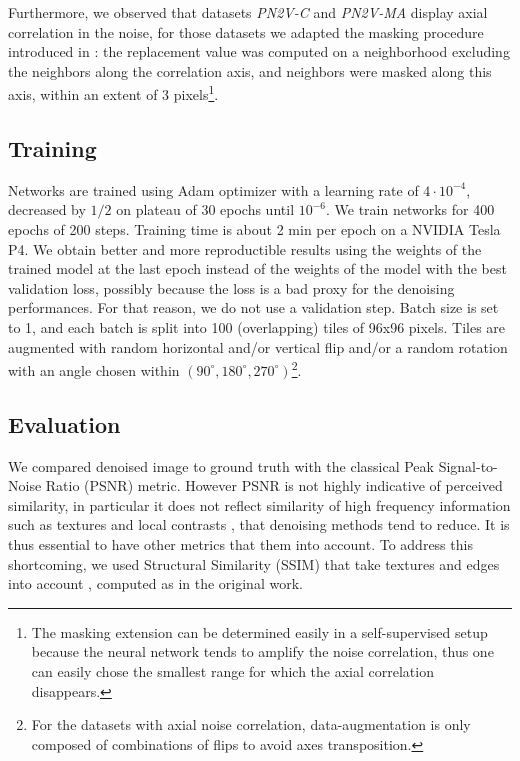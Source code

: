 \documentclass{article}
\begin{document}
Furthermore, we observed that datasets \emph{PN2V-C} and \emph{PN2V-MA} display axial correlation in the noise, for those datasets we adapted the masking procedure introduced in \cite{broaddus2020removing}: the replacement value was computed on a neighborhood excluding the neighbors along the correlation axis, and neighbors were masked along this axis, within an extent of 3 pixels\footnote{The masking extension can be determined easily in a self-supervised setup because the neural network tends to amplify the noise correlation, thus one can easily chose the smallest range for which the axial correlation disappears.}.

\subsection{Training}
Networks are trained using Adam optimizer with a learning rate of $4\cdot10^{-4}$, decreased by $1/2$ on plateau of 30 epochs until $10^{-6}$. We train networks for 400 epochs of 200 steps.
Training time is about 2 min per epoch on a NVIDIA Tesla P4.
We obtain better and more reproductible results using the weights of the trained model at the last epoch instead of the weights of the model with the best validation loss, possibly because the loss is a bad proxy for the denoising performances. For that reason, we do not use a validation step.
Batch size is set to 1, and each batch is split into 100 (overlapping) tiles of 96x96 pixels.
Tiles are augmented with random horizontal and/or vertical flip and/or a random rotation with an angle chosen within $(90^\circ, 180^\circ, 270^\circ)$\footnote{For the datasets with axial noise correlation, data-augmentation is only composed of combinations of flips to avoid axes transposition.}.

\subsection{Evaluation}
We compared denoised image to ground truth with the classical Peak Signal-to-Noise Ratio (PSNR) metric.
However PSNR is not highly indicative of perceived similarity, in particular it does not reflect similarity of high frequency information such as textures and local contrasts \cite{wang2004image}, that denoising methods tend to reduce. It is thus essential to have other metrics that them into account.
To address this shortcoming, we used Structural Similarity (SSIM) that take textures and edges into account \cite{wang2004image}, computed as in the original work.
\end{document}
